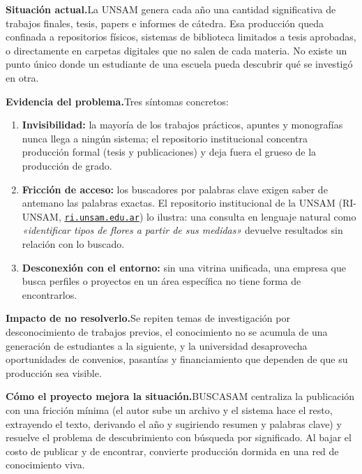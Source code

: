 \documentclass[12pt,a4paper]{article}
\begin{document}
\noindent\textbf{Situación actual.}\enspace La UNSAM genera cada año una cantidad significativa de trabajos finales, tesis, papers e informes de cátedra. Esa producción queda confinada a repositorios físicos, sistemas de biblioteca limitados a tesis aprobadas, o directamente en carpetas digitales que no salen de cada materia. No existe un punto único donde un estudiante de una escuela pueda descubrir qué se investigó en otra.

\medskip
\noindent\textbf{Evidencia del problema.}\enspace Tres síntomas concretos:

\begin{enumerate}
  \item \textbf{Invisibilidad:} la mayoría de los trabajos prácticos, apuntes y monografías nunca llega a ningún sistema; el repositorio institucional concentra producción formal (tesis y publicaciones) y deja fuera el grueso de la producción de grado.
  \item \textbf{Fricción de acceso:} los buscadores por palabras clave exigen saber de antemano las palabras exactas. El repositorio institucional de la UNSAM (RI-UNSAM, \href{https://ri.unsam.edu.ar}{\nolinkurl{ri.unsam.edu.ar}}) lo ilustra: una consulta en lenguaje natural como \emph{«identificar tipos de flores a partir de sus medidas»} devuelve resultados sin relación con lo buscado.
  \item \textbf{Desconexión con el entorno:} sin una vitrina unificada, una empresa que busca perfiles o proyectos en un área específica no tiene forma de encontrarlos.
\end{enumerate}

\medskip
\noindent\textbf{Impacto de no resolverlo.}\enspace Se repiten temas de investigación por desconocimiento de trabajos previos, el conocimiento no se acumula de una generación de estudiantes a la siguiente, y la universidad desaprovecha oportunidades de convenios, pasantías y financiamiento que dependen de que su producción sea visible.

\medskip
\noindent\textbf{Cómo el proyecto mejora la situación.}\enspace BUSCASAM centraliza la publicación con una fricción mínima (el autor sube un archivo y el sistema hace el resto, extrayendo el texto, derivando el año y sugiriendo resumen y palabras clave) y resuelve el problema de descubrimiento con búsqueda por significado. Al bajar el costo de publicar y de encontrar, convierte producción dormida en una red de conocimiento viva.

\end{document}
